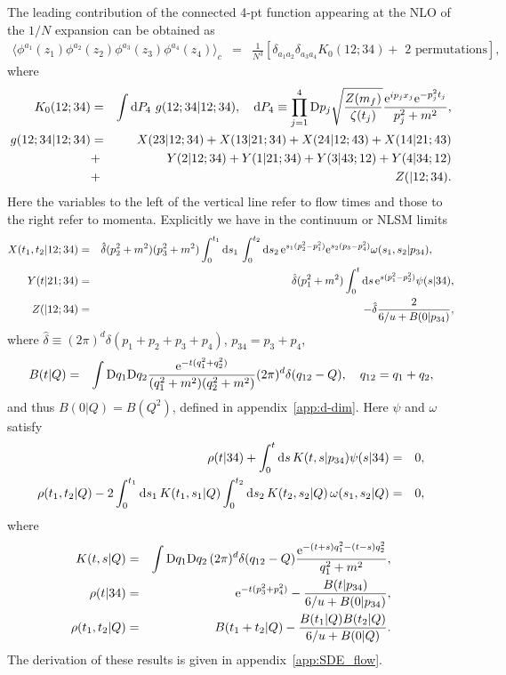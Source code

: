 \documentclass[preprint]{ptephy_v1}%
\newcommand{\rme}{{\rm e}}
\newcommand{\rmd}{{\rm d}}
\newcommand{\rmD}{{\rm D}}
\begin{document}
The leading contribution of the connected 4-pt function appearing at the NLO of the $1/N$ expansion can be obtained as
\begin{eqnarray}
\langle \phi^{a_1}(z_1) \phi^{a_2}(z_2) \phi^{a_3}(z_3)\phi^{a_4}(z_4)\rangle_c
&=& \frac{1}{N^3}\left[\delta_{a_1a_2}\delta_{a_3a_4}K_0(12;34) + \mbox{ 2 permutations} \right] ,
\label{eq:4pt_c}
\end{eqnarray}
where 
\begin{eqnarray}
K_0(12;34) &=& \int  \rmd P_4\ g(12;34\vert 12;34),
\quad \rmd P_4 \equiv \prod_{j=1}^4  \rmD p_j \sqrt{\frac{Z(m_f)}{\zeta(t_j)}} \frac{\rme^{ip_j x_j} \rme^{-p_j^2 t_j}}{p_j^2+m^2},
  \label{eq:K0g} 
\\
g(12;34\vert 12;34) &=& X(23\vert 12;34)+X(13\vert 21;34)+X(24\vert 12;43)+X(14\vert 21;43)\nonumber \\
&+&Y(2\vert 12;34) + Y(1\vert 21;34) +Y(3\vert 43;12) +Y(4\vert 34;12) \nonumber \\
&+& Z(\vert 12;34) .
\end{eqnarray}
 Here the variables to the left of the vertical
  line refer to flow times and those to the right refer to momenta.
Explicitly we have  in the continuum or NLSM limits
\begin{eqnarray}
X(t_1,t_2\vert 12;34) &=& \hat\delta (p_2^2+m^2)(p_3^2+m^2)\int_0^{t_1} \rmd s_1\, 
\int_0^{t_2} \rmd s_2\, \rme^{s_1(p_2^2-p_1^2)} \rme^{s_2(p_3-p_4^2)} \omega(s_1,s_2\vert p_{34}),~~~~~~ \\
Y(t\vert 21;34) &=& \hat\delta (p_1^2+m^2)\int_0^t \rmd s\, \rme^{s(p_1^2-p_2^2)}\psi(s\vert 34), \\
Z(\vert 12;34) &=& -\hat\delta \frac{2}{6/u+ B(0\vert p_{34})}, 
\end{eqnarray}
where $\hat\delta \equiv (2\pi)^d \delta(p_1+p_2+p_3+p_4)$, $p_{34} =p_3+p_4$, 
\begin{eqnarray}
B(t\vert Q) &=& \int \rmD q_1 \rmD q_2 \frac{\rme^{-t(q_1^2+q_2^2)}}{(q_1^2+m^2)(q_2^2+m^2)} (2\pi)^d\delta (q_{12}-Q), \quad q_{12}=q_1+q_2, 
\label{eq:Bt}
\end{eqnarray}
and thus $B(0\vert Q) = B(Q^2)$, defined in appendix~\ref{app:d-dim}.
Here
$\psi$ and $\omega$ satisfy
\begin{eqnarray}
\rho(t\vert 34) +\int_0^t \rmd s\, K(t,s\vert  p_{34}) \psi(s\vert 34)  &=& 0, \label{eq:psi} \\
\rho(t_1,t_2\vert Q)  - 2 \int_0^{t_1} \rmd s_1\, K(t_1,s_1\vert Q) \int_0^{t_2} \rmd s_2\, K(t_2,s_2\vert Q)\, \omega(s_1,s_2\vert Q)
&=& 0, 
\label{eq:omega}
\end{eqnarray}
where
\begin{eqnarray}
K(t,s\vert Q) &=& \int \rmD q_1 \rmD q_2\, (2\pi)^d \delta(q_{12}-Q) \frac{\rme^{-(t+s)q_1^2-(t-s)q_2^2}}{q_1^2+m^2} , 
\label{eq:Kts}\\
\rho(t\vert 34) &=&\rme^{- t(p_3^2+p_4^2)} -\frac{B(t\vert p_{34})}{6/u + B(0\vert p_{34})} , 
\label{eq:rho_t}\\
\rho(t_1,t_2\vert Q) &=& B(t_1+t_2\vert Q) -\frac{B(t_1\vert Q) B(t_2\vert Q)}{6/u +B(0\vert Q)} .
\label{eq:rho_ts}
\end{eqnarray}
The derivation of these results is given in appendix~\ref{app:SDE_flow}.
\end{document}
